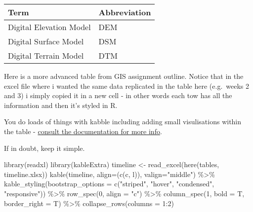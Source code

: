 \documentclass[
  12pt,
  oneside]{book}
\newenvironment{Shaded}{\begin{snugshade}}{\end{snugshade}}
\newcommand{\AttributeTok}[1]{\textcolor[rgb]{0.77,0.63,0.00}{#1}}
\newcommand{\DecValTok}[1]{\textcolor[rgb]{0.00,0.00,0.81}{#1}}
\newcommand{\FunctionTok}[1]{\textcolor[rgb]{0.00,0.00,0.00}{#1}}
\newcommand{\NormalTok}[1]{#1}
\newcommand{\OtherTok}[1]{\textcolor[rgb]{0.56,0.35,0.01}{#1}}
\newcommand{\SpecialCharTok}[1]{\textcolor[rgb]{0.00,0.00,0.00}{#1}}
\newcommand{\StringTok}[1]{\textcolor[rgb]{0.31,0.60,0.02}{#1}}
\begin{document}
\begin{table}[H]
\centering
\begin{tabular}{ll}
\toprule
\textbf{Term} & \textbf{Abbreviation}\\
\midrule
Digital Elevation Model & DEM\\
Digital Surface Model & DSM\\
Digital Terrain Model & DTM\\
\bottomrule
\end{tabular}
\end{table}

Here is a more advanced table from GIS assignment outline. Notice that in the excel file where i wanted the same data replicated in the table here (e.g.~weeks 2 and 3) i simply copied it in a new cell - in other words each tow has all the information and then it's styled in R.

You do loads of things with kabble including adding small visulisations within the table - \href{https://cran.r-project.org/web/packages/kableExtra/vignettes/awesome_table_in_html.html\#Overview}{consult the documentation for more info}.

If in doubt, keep it simple.

\begin{Shaded}
\begin{Highlighting}[]
\FunctionTok{library}\NormalTok{(readxl)}
\FunctionTok{library}\NormalTok{(kableExtra)}
\NormalTok{timeline }\OtherTok{\textless{}{-}} \FunctionTok{read\_excel}\NormalTok{(}\FunctionTok{here}\NormalTok{(}\StringTok{\textquotesingle{}tables\textquotesingle{}}\NormalTok{, }
                            \StringTok{\textquotesingle{}timeline.xlsx\textquotesingle{}}\NormalTok{))}
\FunctionTok{kable}\NormalTok{(timeline, }
      \AttributeTok{align=}\NormalTok{(}\FunctionTok{c}\NormalTok{(}\StringTok{\textquotesingle{}c\textquotesingle{}}\NormalTok{, }\StringTok{\textquotesingle{}l\textquotesingle{}}\NormalTok{)), }
      \AttributeTok{valign=}\StringTok{"middle"}\NormalTok{) }\SpecialCharTok{\%\textgreater{}\%}
    \FunctionTok{kable\_styling}\NormalTok{(}\AttributeTok{bootstrap\_options =} \FunctionTok{c}\NormalTok{(}\StringTok{"striped"}\NormalTok{, }
                                        \StringTok{"hover"}\NormalTok{, }
                                        \StringTok{"condensed"}\NormalTok{, }
                                        \StringTok{"responsive"}\NormalTok{)) }\SpecialCharTok{\%\textgreater{}\%}
    \FunctionTok{row\_spec}\NormalTok{(}\DecValTok{0}\NormalTok{, }
             \AttributeTok{align =} \StringTok{"c"}\NormalTok{) }\SpecialCharTok{\%\textgreater{}\%}
    \FunctionTok{column\_spec}\NormalTok{(}\DecValTok{1}\NormalTok{, }\AttributeTok{bold =}\NormalTok{ T, }
                \AttributeTok{border\_right =}\NormalTok{ T) }\SpecialCharTok{\%\textgreater{}\%}
    \FunctionTok{collapse\_rows}\NormalTok{(}\AttributeTok{columns =} \DecValTok{1}\SpecialCharTok{:}\DecValTok{2}\NormalTok{)}
\end{Highlighting}
\end{Shaded}
\end{document}
